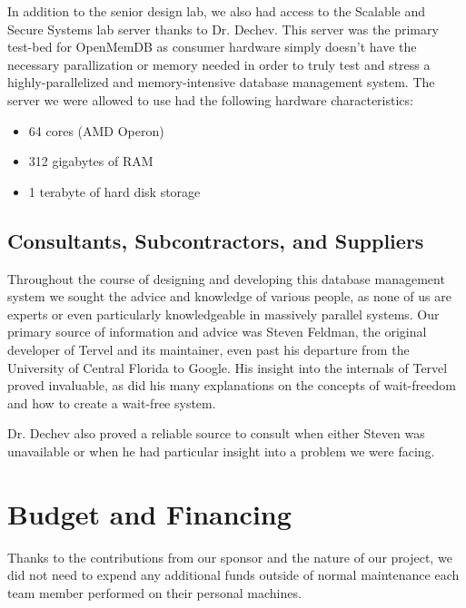 \documentclass[letterpaper, 12pt]{article}
\begin{document}
\par\vspace{\baselineskip}
In addition to the senior design lab, we also had access to the Scalable and Secure Systems lab server
thanks to Dr. Dechev. This server was the primary test-bed for OpenMemDB as consumer hardware simply
doesn't have the necessary parallization or memory needed in order to truly test and stress a
highly-parallelized and memory-intensive database management system. The server we were allowed to
use had the following hardware characteristics:
\begin{itemize}
 \item 64 cores (AMD Operon)
 \item 312 gigabytes of RAM
 \item 1 terabyte of hard disk storage
\end{itemize}

\newpage

\subsection{Consultants, Subcontractors, and Suppliers}
Throughout the course of designing and developing this database management system we sought the advice
and knowledge of various people, as none of us are experts or even particularly knowledgeable in
massively parallel systems. Our primary source of information and advice was Steven Feldman, the
original developer of Tervel and its maintainer, even past his departure from the University of Central
Florida to Google. His insight into the internals of Tervel proved invaluable, as did his many
explanations on the concepts of wait-freedom and how to create a wait-free system.
\par\vspace{\baselineskip}
Dr. Dechev also proved a reliable source to consult when either Steven was unavailable or when he
had particular insight into a problem we were facing.
\newpage

\section{Budget and Financing}
Thanks to the contributions from our sponsor and the nature of our project, we did not need to expend
any additional funds outside of normal maintenance each team member performed on their personal
machines.
\newpage
\end{document}
